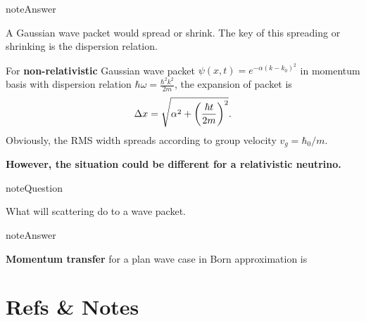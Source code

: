 \documentclass[letterpaper,12pt,english]{sphinxmanual}
\begin{document}
\begin{notice}{note}{Answer}

A Gaussian wave packet would spread or shrink. The key of this spreading or shrinking is the dispersion relation.

For \textbf{non-relativistic} Gaussian wave packet \(\psi(x,t) = e^{-\alpha(k-k_0)^2}\) in momentum basis with dispersion relation \(\hbar\omega = \frac{\hbar^2 k^2}{2m}\), the expansion of packet is
\begin{gather}
\begin{split}\Delta x= \sqrt{\alpha^2+\left(\frac{\hbar t}{2m}\right)^2} .\end{split}\notag
\end{gather}
Obviously, the RMS width spreads according to group velocity \(v_g = \hbar _0/m\).

\textbf{However, the situation could be different for a relativistic neutrino.}
\end{notice}

\begin{notice}{note}{Question}

What will scattering do to a wave packet.
\end{notice}

\begin{notice}{note}{Answer}

\textbf{Momentum transfer} for a plan wave case in Born approximation is
\end{notice}


\section{Refs \& Notes}
\label{oscillations:refs-notes}
\end{document}
